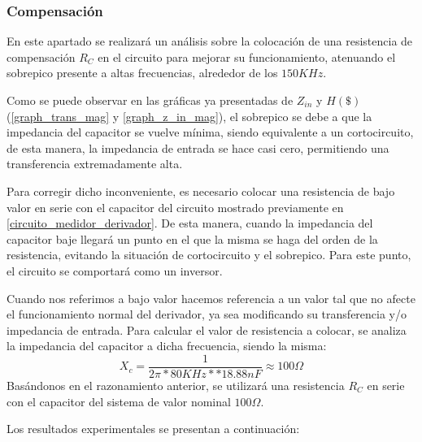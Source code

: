 \subsubsection{Compensación}
En este apartado se realizará un análisis sobre la colocación de una resistencia de compensación
$R_C$ en el circuito para mejorar su funcionamiento, atenuando el sobrepico presente a altas 
frecuencias, alrededor de los $150 KHz$. \par 
Como se puede observar en las gráficas 
ya presentadas de $Z_{in}$ y $H(\$)$ (\ref{graph_trans_mag} y \ref{graph_z_in_mag}), el sobrepico
se debe a que la impedancia del capacitor se vuelve mínima, siendo equivalente a un cortocircuito, de
esta manera, la impedancia de entrada se hace casi cero, permitiendo una transferencia extremadamente alta.\par 
Para corregir dicho inconveniente, es necesario colocar una resistencia de bajo valor 
en serie con el capacitor del circuito 
mostrado previamente en \ref{circuito_medidor_derivador}. De esta manera, cuando la impedancia del capacitor
baje llegará un punto en el que la misma se haga del orden de la resistencia, evitando la situación de cortocircuito
y el sobrepico. Para este punto, el circuito se comportará como un inversor. \par 
Cuando nos referimos a bajo valor hacemos referencia a un valor tal que no afecte el funcionamiento 
normal del derivador, ya sea modificando su transferencia y/o impedancia de entrada. Para calcular el 
valor de resistencia a colocar, se analiza la impedancia del capacitor a dicha frecuencia, siendo la misma:
\vspace{2mm}
\begin{equation*}
    X_c=\frac{1}{2\pi*80KHz**18.88nF}\approx 100 \Omega
\end{equation*}
\vspace{2mm}
Basándonos en el razonamiento anterior, se utilizará una resistencia $R_C$ en serie con 
el capacitor del sistema de valor nominal $100\Omega$. \par 

Los resultados experimentales se presentan a continuación:

